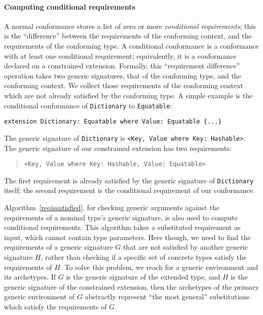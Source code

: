 \documentclass[../generics]{subfiles}
\begin{document}
\paragraph{Computing conditional requirements}
A normal conformance stores a list of zero or more \emph{conditional requirements}; this is the ``difference'' between the requirements of the conforming context, and the requirements of the conforming type. A conditional conformance is a conformance with at least one conditional requirement; equivalently, it is a conformance declared on a constrained extension. Formally, this ``requirement difference'' operation takes two generic signatures, that of the conforming type, and the conforming context. We collect those requirements of the conforming context which are not already satisfied by the conforming type. 
A simple example is the conditional conformance of \texttt{Dictionary} to \texttt{Equatable}:
\begin{Verbatim}
extension Dictionary: Equatable where Value: Equatable {...}
\end{Verbatim}
The generic signature of \texttt{Dictionary} is \verb|<Key, Value where Key: Hashable>|. The generic signature of our constrained extension has two requirements:
\begin{quote}
\begin{verbatim}
<Key, Value where Key: Hashable, Value: Equatable>
\end{verbatim}
\end{quote}
The first requirement is already satisfied by the generic signature of \texttt{Dictionary} itself; the second requirement is the conditional requirement of our conformance.

Algorithm~\ref{reqissatisfied}, for checking generic arguments against the requirements of a nominal type's generic signature, is also used to compute conditional requirements. This algorithm takes a substituted requirement as input, which cannot contain type parameters. Here though, we need to find the requirements of a generic signature $G$ that are not satisfied by another generic signature $H$, rather than checking if a specific set of concrete types satisfy the requirements of $H$. To solve this problem, we reach for a generic environment and its archetypes. If $G$ is the generic signature of the extended type, and $H$ is the generic signature of the constrained extension, then the archetypes of the primary generic environment of $G$ abstractly represent ``the most general'' substitutions which satisfy the requirements of $G$.
\end{document}
